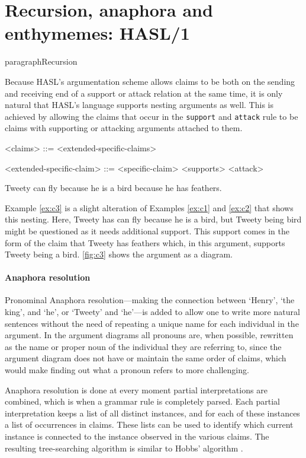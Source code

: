 \documentclass{IOS-Book-Article}
\begin{document}
\section{Recursion, anaphora and enthymemes: HASL/1}

paragraph{Recursion}

Because HASL's argumentation scheme allows claims to be both on the sending and receiving end of a support or attack relation at the same time, it is only natural that HASL's language supports nesting arguments as well. This is achieved by allowing the claims that occur in the \texttt{support} and \texttt{attack} rule to be claims with supporting or attacking arguments attached to them.

\begin{grammar}

<claims> ::= <extended-specific-claims>

<extended-specific-claim> ::= <specific-claim> <supports> <attack>

\end{grammar}

\begin{exe}
	\ex\label{ex:c3} Tweety can fly because he is a bird because he has feathers.
\end{exe}

\noindent Example \ref{ex:c3} is a slight alteration of Examples \ref{ex:c1} and \ref{ex:c2} that shows this nesting. Here, Tweety has can fly because he is a bird, but Tweety being bird might be questioned as it needs additional support. This support comes in the form of the claim that Tweety has feathers which, in this argument, supports Tweety being a bird. \autoref{fig:c3} shows the argument as a diagram.

\paragraph{Anaphora resolution}
Pronominal Anaphora resolution---making the connection between `Henry', `the king', and `he', or `Tweety' and `he'---is added to allow one to write more natural sentences without the need of repeating a unique name for each individual in the argument. In the argument diagrams all pronouns are, when possible, rewritten as the name or proper noun of the individual they are referring to, since the argument diagram does not have or maintain the same order of claims, which would make finding out what a pronoun refers to more challenging.

Anaphora resolution is done at every moment partial interpretations are combined, which is when a grammar rule is completely parsed. Each partial interpretation keeps a list of all distinct instances, and for each of these instances a list of occurrences in claims. These lists can be used to identify which current instance is connected to the instance observed in the various claims. The resulting tree-searching algorithm is similar to Hobbs' algorithm \cite{hobbs1978}.
\end{document}
